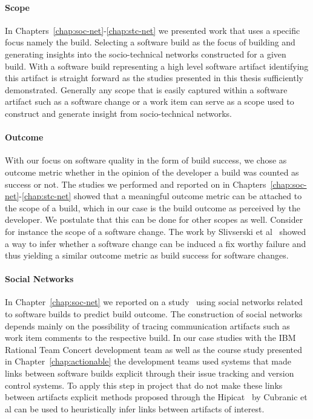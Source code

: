 \paragraph{Scope}
In Chapters~\ref{chap:soc-net}-\ref{chap:stc-net} we presented work that uses a specific focus namely the build.
Selecting a software build as the focus of building and generating insights into the socio-technical networks constructed for a given build.
With a software build representing a high level software artifact identifying this artifact is straight forward as the studies presented in this thesis sufficiently demonstrated.
Generally any scope that is easily captured within a software artifact such as a software change or a work item can serve as a scope used to construct and generate insight from socio-technical networks.

\paragraph{Outcome}
With our focus on software quality in the form of build success, we chose as outcome metric whether in the opinion of the developer a build was counted as success or not.
The studies we performed and reported on in Chapters~\ref{chap:soc-net}-\ref{chap:stc-net} showed that a meaningful outcome metric can be attached to the scope of a build, which in our case is the build outcome as perceived by the developer.
We postulate that this can be done for other scopes as well.
Consider for instance the scope of a software change.
The work by Slivserski et al~\cite{sliwerski:notes} showed a way to infer whether a software change can be induced a fix worthy failure and thus yielding a similar outcome metric as build success for software changes. 

\paragraph{Social Networks}
In Chapter~\ref{chap:soc-net} we reported on a study~\cite{wolf:icse:2009} using social networks related to software builds to predict build outcome.
The construction of social networks depends mainly on the possibility of tracing communication artifacts such as work item comments to the respective build.
In our case studies with the IBM Rational Team Concert development team as well as the course study presented in Chapter~\ref{chap:actionable} the development teams used systems that made links between software builds explicit through their issue tracking and version control systems.
To apply this step in project that do not make these links between artifacts explicit methods proposed through the Hipicat~\cite{cubranic:tse:2005} by Cubranic et al can be used to heuristically infer links between artifacts of interest.

